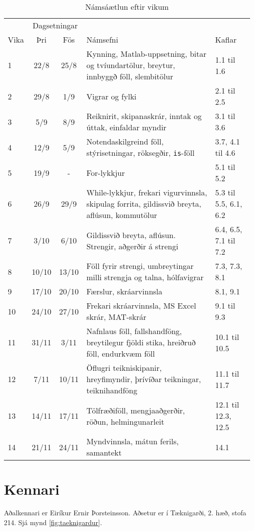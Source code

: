 \documentclass[justified, nobib]{tufte-handout}
\begin{document}
\begin{table*}
\caption{Námsáætlun eftir vikum}
\label{tab:schedule}
\begin{center}
\renewcommand{\arraystretch}{1.2}
\begin{tabularx}{\linewidth}{lccXp{3cm}}
\toprule
&\multicolumn{2}{c}{Dagsetningar}&&\\
\cmidrule{2-3}
Vika&Þri&Fös&Námsefni&Kaflar\\
\midrule
1	&22/8	&25/8	& Kynning, Matlab-uppsetning, bitar og tvíundartölur, breytur, innbyggð föll, slembitölur &1.1 til 1.6\\
2	&29/8	&1/9	& Vigrar og fylki&2.1 til 2.5\\
3	&5/9	&8/9	& Reiknirit, skipanaskrár, inntak og úttak, einfaldar myndir&3.1 til 3.6\\
4	&12/9	&5/9	& Notendaskilgreind föll, stýrisetningar, röksegðir, \texttt{is}-föll&3.7, 4.1 til 4.6\\
5	&19/9	&-	    & For-lykkjur&5.1 til 5.2\\
6	&26/9	&29/9	& While-lykkjur, frekari vigurvinnsla, skipulag forrita, gildissvið breyta, aflúsun, kommutölur&5.3 til 5.5, 6.1, 6.2\\
7	&3/10	&6/10	& Gildissvið breyta, aflúsun. Strengir, aðgerðir á strengi&6.4, 6.5, 7.1 til 7.2\\
8	&10/10	&13/10	& Föll fyrir strengi, umbreytingar milli strengja og talna, hólfavigrar&7.3, 7.3, 8.1\\
9	&17/10	&20/10	& Færslur, skráarvinnsla&8.1, 9.1\\
10	&24/10	&27/10	& Frekari skráarvinnsla, MS Excel skrár, MAT-skrár&9.1 til 9.3\\
11	&31/11	&3/11	& Nafnlaus föll, fallshandföng, breytilegur fjöldi stika, hreiðruð föll, endurkvæm föll&10.1 til 10.5\\
12	&7/11	&10/11	& Öflugri teikniskipanir, hreyfimyndir, þrívíðar teikningar, teiknihandföng&11.1 til 11.7\\
13	&14/11	&17/11	& Tölfræðiföll, mengjaaðgerðir, röðun, helmingunarleit&12.1 til 12.3, 12.5\\
14	&21/11	&24/11	& Myndvinnsla, mátun ferils, samantekt&14.1\\
\bottomrule
\end{tabularx}
\end{center}
\end{table*}

\section{Kennari}
Aðalkennari er Eiríkur Ernir Þorsteinsson. Aðsetur er í Tæknigarði, 2. hæð, stofa 214. Sjá mynd \ref{fig:taeknigardur}.
\end{document}

